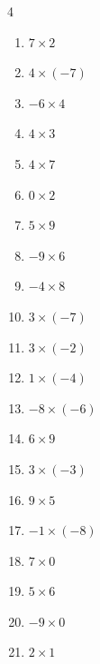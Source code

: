 \begin{multicols}{4}
\begin{enumerate}
  \item $7\times 2$
        \phantom{$=14$}

  \item $4\times (-7)$
        \phantom{$=-28$}

  \item $-6\times 4$
        \phantom{$=-24$}

  \item $4\times 3$
        \phantom{$=12$}

  \item $4\times 7$
        \phantom{$=28$}

\columnbreak %

  \item $0\times 2$
        \phantom{$=0$}

  \item $5\times 9$
        \phantom{$=45$}

  \item $-9\times 6$
        \phantom{$=-54$}

  \item $-4\times 8$
        \phantom{$=-32$}

  \item $3\times (-7)$
        \phantom{$=-21$}

  \item $3\times (-2)$
        \phantom{$=-6$}

  \item $1\times (-4)$
        \phantom{$=-4$}

  \item $-8\times (-6)$
        \phantom{$=48$}

  \item $6\times 9$
        \phantom{$=54$}

  \item $3\times (-3)$
        \phantom{$=-9$}

  \item $9\times 5$
        \phantom{$=45$}

  \item $-1\times (-8)$
        \phantom{$=8$}

  \item $7\times 0$
        \phantom{$=0$}

  \item $5\times 6$
        \phantom{$=30$}

  \item $-9\times 0$
        \phantom{$=0$}

  \item $2\times 1$
        \phantom{$=2$}


\end{enumerate}
\end{multicols}

